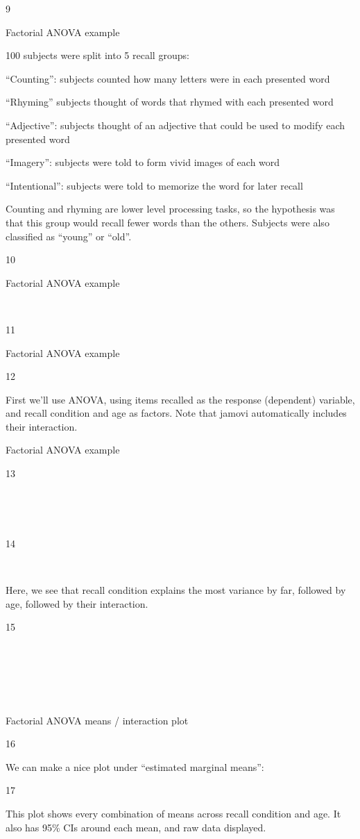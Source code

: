 \documentclass[
  letterpaper,
  DIV=11,
  numbers=noendperiod]{scrreprt}
\begin{document}
9

Factorial ANOVA example

100 subjects were split into 5 recall groups:

``Counting'': subjects counted how many letters were in each presented
word

``Rhyming'' subjects thought of words that rhymed with each presented
word

``Adjective'': subjects thought of an adjective that could be used to
modify each presented word

``Imagery'': subjects were told to form vivid images of each word

``Intentional'': subjects were told to memorize the word for later
recall

Counting and rhyming are lower level processing tasks, so the hypothesis
was that this group would recall fewer words than the others. Subjects
were also classified as ``young'' or ``old''.

10

Factorial ANOVA example

~

11

Factorial ANOVA example

12

First we'll use ANOVA, using items recalled as the response (dependent)
variable, and recall condition and age as factors. Note that jamovi
automatically includes their interaction.

Factorial ANOVA example

13

~

~

14

~

Here, we see that recall condition explains the most variance by far,
followed by age, followed by their interaction.

15

~

~

~

Factorial ANOVA means / interaction plot

16

We can make a nice plot under ``estimated marginal means'':

17

This plot shows every combination of means across recall condition and
age. It also has 95\% CIs around each mean, and raw data displayed.
\end{document}
